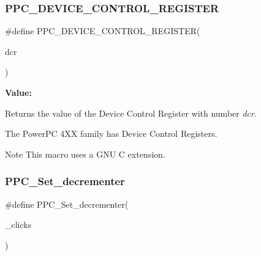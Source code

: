 \subsubsection{\texorpdfstring{PPC\_DEVICE\_CONTROL\_REGISTER}{PPC\_DEVICE\_CONTROL\_REGISTER}}
{\footnotesize\ttfamily \#define P\+P\+C\+\_\+\+D\+E\+V\+I\+C\+E\+\_\+\+C\+O\+N\+T\+R\+O\+L\+\_\+\+R\+E\+G\+I\+S\+T\+ER(\begin{DoxyParamCaption}\item[{}]{dcr }\end{DoxyParamCaption})}

{\bfseries Value\+:}
\begin{DoxyCode}{0}
\DoxyCodeLine{(\{ \(\backslash\)}
\DoxyCodeLine{    ); \(\backslash\)}
\DoxyCodeLine{  \} )}

\end{DoxyCode}


Returns the value of the Device Control Register with number {\itshape dcr}. 

The Power\+PC 4XX family has Device Control Registers.

\begin{DoxyNote}{Note}
This macro uses a G\+NU C extension. 
\end{DoxyNote}
\mbox{\label{group__RTEMSBSPsPowerPCSharedUtility_gacda5f207b34a1bd67bcd917080d73e90}} 
\subsubsection{\texorpdfstring{PPC\_Set\_decrementer}{PPC\_Set\_decrementer}}
{\footnotesize\ttfamily \#define P\+P\+C\+\_\+\+Set\+\_\+decrementer(\begin{DoxyParamCaption}\item[{}]{\+\_\+clicks }\end{DoxyParamCaption})}

